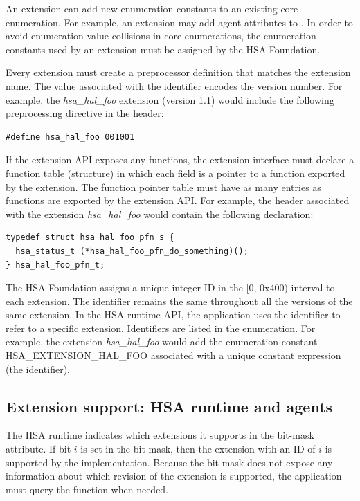 \documentclass[oneside]{book}
\begin{document}
An extension can add new enumeration constants to an existing core
enumeration. For example, an extension may add agent attributes to
. In order to avoid enumeration value collisions in
core enumerations, the enumeration constants used by an extension must be
assigned by the HSA Foundation.

Every extension must create a preprocessor definition that matches the extension
name. The value associated with the identifier encodes the version number. For
example, the \textit{hsa_hal_foo} extension (version 1.1) would include the
following preprocessing directive in the header:
\begin{lstlisting}
#define hsa_hal_foo 001001
\end{lstlisting}

If the extension API exposes any functions, the extension interface must declare
a function table (structure) in which each field is a pointer to a
function exported by the extension. The function pointer table must have as many
entries as functions are exported by the extension API. For example, the header
associated with the extension \textit{hsa_hal_foo} would contain the following
declaration:
\begin{lstlisting}
typedef struct hsa_hal_foo_pfn_s {
  hsa_status_t (*hsa_hal_foo_pfn_do_something)();
} hsa_hal_foo_pfn_t;
\end{lstlisting}

The HSA Foundation assigns a unique integer ID in the [0, 0x400) interval to
each extension. The identifier remains the same throughout all the versions of
the same extension. In the HSA runtime API, the application uses the identifier
to refer to a specific extension. Identifiers are listed in the
 enumeration. For example, the extension
\textit{hsa_hal_foo} would add the enumeration constant HSA_EXTENSION_HAL_FOO
associated with a unique constant expression (the identifier).

\subsection{Extension support: HSA runtime and agents}

The HSA runtime indicates which extensions it supports in the
 bit-mask attribute. If bit $i$ is set in the
bit-mask, then the extension with an ID of $i$ is supported by the
implementation. Because the bit-mask does not expose any information about which
revision of the extension is supported, the application must query the function
 when needed.
\end{document}
